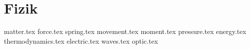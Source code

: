 \chapter{Fizik}
{matter.tex}
{force.tex}
{spring.tex}
{movement.tex}
{moment.tex}
{pressure.tex}
{energy.tex}
{thermodynamics.tex}
{electric.tex}
{waves.tex}
{optic.tex}